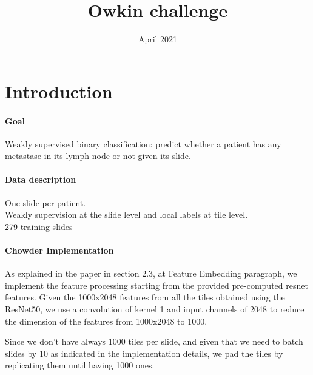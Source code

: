 \documentclass{article}
\title{Owkin challenge}
\author{ }
\date{April 2021}
\begin{document}
\maketitle

\section{Introduction}

\paragraph{Goal}
Weakly supervised binary classification: predict whether a patient has any metastase in its lymph node or not given its slide.

\paragraph{Data description}
One slide per patient. \\
Weakly supervision at the slide level and local labels at tile level.\\
279 training slides


\paragraph{Chowder Implementation}
As explained in the paper in section 2.3, at Feature Embedding paragraph, we implement the feature processing starting from the provided pre-computed resnet features. 
Given the 1000x2048 features from all the tiles obtained using the ResNet50, we use a convolution of kernel 1 and input channels of 2048 to reduce the dimension of the features from 1000x2048 to 1000.


Since we don't have always 1000 tiles per slide, and given that we need to batch slides by 10 as indicated in the implementation details, we pad the tiles by replicating them until having 1000 ones.




\end{document}
